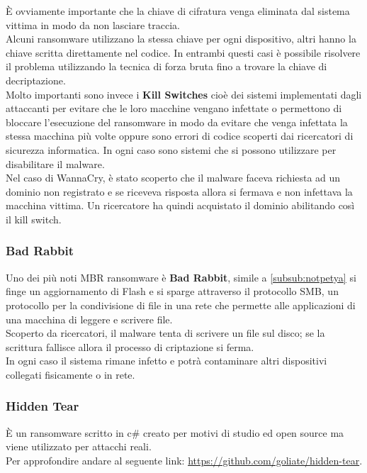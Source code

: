 È ovviamente importante che la chiave di cifratura venga eliminata dal sistema vittima in modo da non lasciare traccia.\\
Alcuni ransomware utilizzano la stessa chiave per ogni dispositivo, altri hanno la chiave scritta direttamente nel codice.
In entrambi questi casi è possibile risolvere il problema utilizzando la tecnica di forza bruta fino a trovare la chiave di decriptazione.\\
Molto importanti sono invece i \textbf{Kill Switches} cioè dei sistemi implementati dagli attaccanti per evitare che le loro macchine vengano infettate o permettono di bloccare l'esecuzione del ransomware in modo da evitare che venga infettata la stessa macchina più volte oppure sono errori di codice scoperti dai ricercatori di sicurezza informatica.
In ogni caso sono sistemi che si possono utilizzare per disabilitare il malware.\\
Nel caso di WannaCry, è stato scoperto che il malware faceva richiesta ad un dominio non registrato e se riceveva risposta allora si fermava e non infettava la macchina vittima.
Un ricercatore ha quindi acquistato il dominio abilitando così il kill switch.

\subsubsection{Bad Rabbit}
Uno dei più noti \acrshort{MBR} ransomware è \textbf{Bad Rabbit}, simile a \ref{subsub:notpetya} si finge un aggiornamento di Flash e si sparge attraverso il protocollo \acrfull{SMB}, un protocollo per la condivisione di file in una rete che permette alle applicazioni di una macchina di leggere e scrivere file.\\
Scoperto da ricercatori, il malware tenta di scrivere un file sul disco; se la scrittura fallisce allora il processo di criptazione si ferma.\\
In ogni caso il sistema rimane infetto e potrà contaminare altri dispositivi collegati fisicamente o in rete.

\subsubsection{Hidden Tear}
È un ransomware scritto in c\# creato per motivi di studio ed open source ma viene utilizzato per attacchi reali.\\
Per approfondire andare al seguente link: \url{https://github.com/goliate/hidden-tear}.

